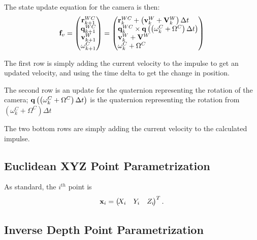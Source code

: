 \documentclass[twoside]{article}
\begin{document}
The state update equation for the camera is then:
\begin{equation}
{\bf f}_v =
\left(\begin{matrix}{\bf r}^{WC}_{k+1} \cr {\bf q}^{WC}_{k+1} \cr {\bf v}^{W}_{k+1} \cr {\omega}^{C}_{k+1}\end{matrix}\right) =
\left(\begin{matrix}{\bf r}^{WC}_{k}+\left({\bf v}_k^W+{\bf V}_k^W\right)\Delta t\hfill \cr {\bf q}^{WC}_{k} \times {\bf q}\left(\left({\omega}^C_k+\Omega^C\right)\Delta t\right)\hfill \cr {\bf v}^{W}_{k}+{\bf V}^W\hfill \cr {\omega}^{C}_{k}+\Omega^C\hfill\end{matrix}\right) 
\end{equation}

The first row is simply adding the current velocity to the impulse to get an updated velocity, and using the time delta to get the change in position.

The second row is an update for the quaternion representing the rotation of the camera; ${\bf q}\left(\left({\omega}^C_k+\Omega^C\right)\Delta t\right)$ is the quaternion representing the rotation from $\left({\omega}^C_k+\Omega^C\right)\Delta t$

The two bottom rows are simply adding the current velocity to the calculated impulse.

\subsection*{Euclidean XYZ Point Parametrization}
As standard, the $i^{th}$ point is 
\begin{equation}
{\bf x}_i = \left(\!\begin{matrix}X_i & Y_i & Z_i\end{matrix}\!\right) ^ T.
\end{equation}

\subsection*{Inverse Depth Point Parametrization}
\end{document}
